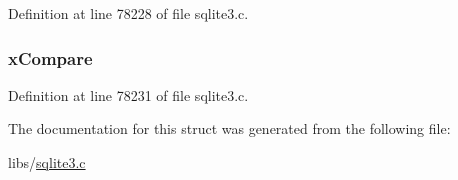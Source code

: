 Definition at line 78228 of file sqlite3.\+c.

\hypertarget{struct_sort_subtask_a6dc03188d984469cb2fff10d3eebc78f}{}
\subsubsection[{x\+Compare}]{ x\+Compare}\label{struct_sort_subtask_a6dc03188d984469cb2fff10d3eebc78f}


Definition at line 78231 of file sqlite3.\+c.



The documentation for this struct was generated from the following file\+:\begin{DoxyCompactItemize}
\item 
libs/\hyperlink{sqlite3_8c}{sqlite3.\+c}\end{DoxyCompactItemize}
